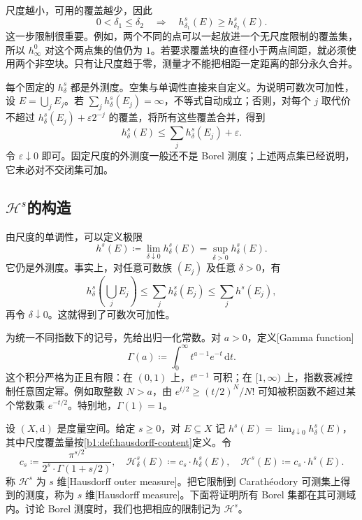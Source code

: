 \ProseParagraphBreak

尺度越小，可用的覆盖越少，因此
\[
0<\delta_1\leq\delta_2
\quad\Longrightarrow\quad
h^s_{\delta_1}(E)\geq h^s_{\delta_2}(E).
\]
这一步限制很重要。例如，两个不同的点可以一起放进一个无尺度限制的覆盖集，所以 \(h^0_\infty\) 对这个两点集的值仍为 \(1\)。若要求覆盖块的直径小于两点间距，就必须使用两个非空块。只有让尺度趋于零，测量才不能把相距一定距离的部分永久合并。

\ProseParagraphBreak

每个固定的 \(h^s_\delta\) 都是外测度。空集与单调性直接来自定义。为说明可数次可加性，设 \(E=\bigcup_jE_j\)。若 \(\sum_jh^s_\delta(E_j)=\infty\)，不等式自动成立；否则，对每个 \(j\) 取代价不超过 \(h^s_\delta(E_j)+\varepsilon2^{-j}\) 的覆盖，将所有这些覆盖合并，得到
\[
h^s_\delta(E)\leq\sum_jh^s_\delta(E_j)+\varepsilon.
\]
令 \(\varepsilon\downarrow0\) 即可。固定尺度的外测度一般还不是 Borel 测度；上述两点集已经说明，它未必对不交闭集可加。

\subsection{\texorpdfstring{\(\mathcal H^s\)}{Hausdorff 测度}的构造}
\label{b1:subsec:150102}

由尺度的单调性，可以定义极限
\[
h^s(E)\coloneqq\lim_{\delta\downarrow0}h^s_\delta(E)
=\sup_{\delta>0}h^s_\delta(E).
\]
它仍是外测度。事实上，对任意可数族 \((E_j)\) 及任意 \(\delta>0\)，有
\[
h^s_\delta\left(\bigcup_jE_j\right)
\leq\sum_jh^s_\delta(E_j)
\leq\sum_jh^s(E_j),
\]
再令 \(\delta\downarrow0\)。这就得到了可数次可加性。

\ProseParagraphBreak

为统一不同指数下的记号，先给出归一化常数。对 \(a>0\)，定义[Gamma function]
\[
\Gamma(a)\coloneqq\int_0^\infty t^{a-1}e^{-t}\,\mathrm dt.
\]
这个积分严格为正且有限：在 \((0,1)\) 上，\(t^{a-1}\) 可积；在 \([1,\infty)\) 上，指数衰减控制任意固定幂。例如取整数 \(N>a\)，由 \(e^{t/2}\geq(t/2)^N/N!\) 可知被积函数不超过某个常数乘 \(e^{-t/2}\)。特别地，\(\Gamma(1)=1\)。

\begin{definition}
\label{b1:def:hausdorff-measure}
设 \((X,\mathrm d)\) 是度量空间。给定 \(s\geq0\)，对 \(E\subseteq X\) 记 \(h^s(E)=\lim_{\delta\downarrow0}h^s_\delta(E)\)，其中尺度覆盖量按\cref{b1:def:hausdorff-content}定义。令
\[
c_s\coloneqq\frac{\pi^{s/2}}{2^s\cdot \Gamma(1+s/2)},
\quad
\mathcal H^s_\delta(E)\coloneqq c_s \cdot h^s_\delta(E),
\quad
\mathcal H^s(E)\coloneqq c_s \cdot h^s(E).
\]
称 \(\mathcal H^s\) 为 \(s\) 维\allowbreak{}[Hausdorff outer measure]。把它限制到 Carathéodory 可测集上得到的测度，称为 \(s\) 维\allowbreak{}[Hausdorff measure]。下面将证明所有 Borel 集都在其可测域内。讨论 Borel 测度时，我们也把相应的限制记为 \(\mathcal H^s\)。
\end{definition}

